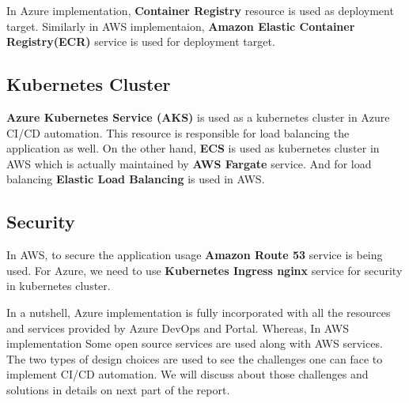 In Azure implementation, \textbf{Container Registry} resource is used as deployment target. Similarly in AWS implementaion, \textbf{Amazon Elastic Container Registry(ECR)} service is used for deployment target.

\subsection{Kubernetes Cluster}

\textbf{Azure Kubernetes Service (AKS)} is used as a kubernetes cluster in Azure CI/CD automation. This resource is responsible for load balancing the application as well. On the other hand, \textbf{ECS} is used as kubernetes cluster in AWS which is actually maintained by \textbf{AWS Fargate} service. And for load balancing \textbf{Elastic Load Balancing} is used in AWS.

\subsection{Security}

In AWS, to secure the application usage \textbf{Amazon Route 53} service is being used. For Azure, we need to use \textbf{Kubernetes Ingress nginx} service for security in kubernetes cluster.

In a nutshell, Azure implementation is fully incorporated with all the resources and services provided by Azure DevOps and Portal. Whereas, In AWS implementation Some open source services are used along with AWS services. The two types of design choices are used to see the challenges one can face to implement CI/CD automation. We will discuss about those challenges and solutions in details on next part of the report.